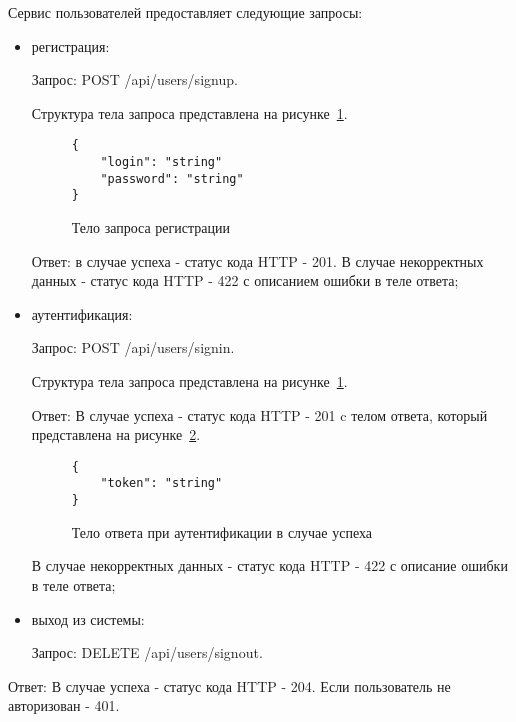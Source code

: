 Сервис пользователей предоставляет следующие запросы:
\begin{itemize}
	\item регистрация:

	      Запрос: POST /api/users/signup.

	      Структура тела запроса представлена на рисунке~\ref{f:signup-request-body}.

	      \begin{figure}[ht]
		      \centering
		      \vspace{\toppaddingoffigure}
		      \begin{lstlisting}
{
    "login": "string"
    "password": "string"
}
    \end{lstlisting}
		      \caption{Тело запроса регистрации}
		      \label{f:signup-request-body}
	      \end{figure}

	      Ответ: в случае успеха - статус кода HTTP - 201. В случае некорректных
	      данных - статус кода HTTP - 422 с описанием ошибки в теле ответа;


	\item аутентификация:

	      Запрос: POST /api/users/signin.

	      Структура тела запроса представлена на рисунке~\ref{f:signup-request-body}.

	      Ответ: В случае успеха - статус кода HTTP - 201 c телом ответа, который
	      представлена на рисунке~\ref{f:signin-response-body}.

	      \begin{figure}[ht]
		      \centering
		      \vspace{\toppaddingoffigure}
		      \begin{lstlisting}
{
    "token": "string"
}
        \end{lstlisting}
		      \caption{Тело ответа при аутентификации в случае успеха}
		      \label{f:signin-response-body}
	      \end{figure}

	      В случае некорректных данных - статус кода HTTP - 422 с описание
	      ошибки в теле ответа;

	\item выход из системы:

	      Запрос: DELETE /api/users/signout.

\end{itemize}
Ответ: В случае успеха - статус кода HTTP - 204. Если пользователь не
авторизован - 401.

